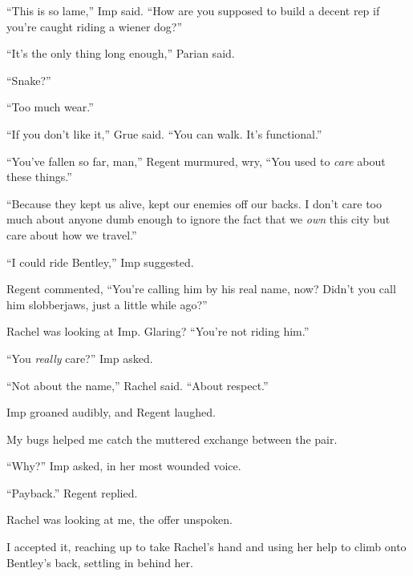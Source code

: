 ``This is so lame,'' Imp said.  ``How are you supposed to build a decent rep if you're caught riding a wiener dog?''



``It's the only thing long enough,'' Parian said.



``Snake?''



``Too much wear.''



``If you don't like it,'' Grue said. ``You can walk.  It's functional.''



``You've fallen so far, man,'' Regent murmured, wry,  ``You used to \emph{care} about these things.''



``Because they kept us alive, kept our enemies off our backs.  I don't care too much about anyone dumb enough to ignore the fact that we \emph{own} this city but care about how we travel.''



``I could ride Bentley,'' Imp suggested.



Regent commented, ``You're calling him by his real name, now?  Didn't you call him slobberjaws, just a little while ago?''



Rachel was looking at Imp.  Glaring?  ``You're not riding him.''



``You \emph{really} care?'' Imp asked.



``Not about the name,'' Rachel said.  ``About respect.''



Imp groaned audibly, and Regent laughed.



My bugs helped me catch the muttered exchange between the pair.



``Why?''  Imp asked, in her most wounded voice.



``Payback.'' Regent replied.



Rachel was looking at me, the offer unspoken.



I accepted it, reaching up to take Rachel's hand and using her help to climb onto Bentley's back, settling in behind her.



